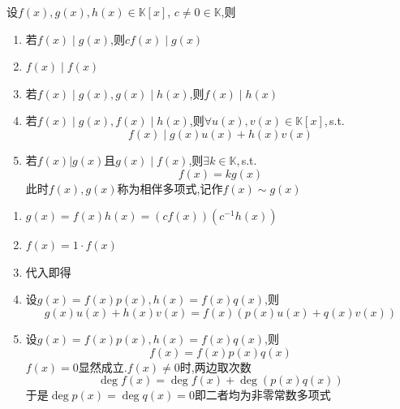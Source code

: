 \begin{formal}
\begin{proposition}[整除的若干性质]\label{prop:整除的若干性质}
    设$f\left(x\right),g\left(x\right),h\left(x\right)\in \mathbb{K}\left[x\right]$,
    $c\neq 0\in\mathbb{K}$,则
    \begin{enumerate}[label={\textup{(\arabic*)}}]
        \item 若$f\left(x\right)\mid g\left(x\right)$,则$cf\left(x\right)\mid g\left(x\right)$
        \item $f\left(x\right)\mid f\left(x\right)$
        \item 若$f\left(x\right)\mid g\left(x\right),g\left(x\right)\mid h\left(x\right)$,则$f\left(x\right)\mid h\left(x\right)$
        \item 若$f\left(x\right)\mid g\left(x\right),f\left(x\right)\mid h\left(x\right)$,则$\forall u\left(x\right),v\left(x\right)\in \mathbb{K}\left[x\right]$,\,\textup{s.t.}
        \[
        f\left(x\right)\mid g\left(x\right)u\left(x\right)+h\left(x\right)v\left(x\right)
        \] 
        \item 若$f\left(x\right)|g\left(x\right)$且$g\left(x\right)\mid f\left(x\right)$,则$\exists k\in\mathbb{K}$,\,\textup{s.t.}\[
        f\left(x\right)=kg\left(x\right)
        \]
        此时$f\left(x\right),g\left(x\right)$称为相伴多项式,记作$f\left(x\right)\sim g\left(x\right)$
    \end{enumerate}
\end{proposition}
\begin{Proof}
\begin{enumerate}[label={\textup{(\arabic*)}}]
    \item $g\left(x\right)=f\left(x\right)h\left(x\right)=\left(cf\left(x\right)\right)\left(c^{-1}h\left(x\right)\right)$
    \item $f\left(x\right)=1\cdot f\left(x\right)$
    \item 代入即得
    \item 设$g\left(x\right)=f\left(x\right)p\left(x\right),h\left(x\right)=f\left(x\right)q\left(x\right)$,则
    \[
    g\left(x\right)u\left(x\right)+h\left(x\right)v\left(x\right)=f\left(x\right)\left(p\left(x\right)u\left(x\right)+q\left(x\right)v\left(x\right)\right)
    \]
    \item 设$g\left(x\right)=f\left(x\right)p\left(x\right),h\left(x\right)=f\left(x\right)q\left(x\right)$,则
    \[
    f\left(x\right)=f\left(x\right)p\left(x\right)q\left(x\right)
    \]
    $f\left(x\right)=0$显然成立.$f\left(x\right)\neq 0$时,两边取次数
    \[
    \deg f\left(x\right)=\deg f\left(x\right)+\deg \left(p\left(x\right)q\left(x\right)\right)
    \]
    于是$\deg p\left(x\right)=\deg q\left(x\right)=0$即二者均为非零常数多项式
    \qedhere
\end{enumerate}
\end{Proof}
\end{formal}
